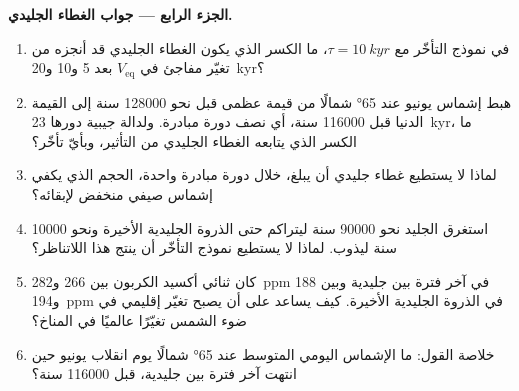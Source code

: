 \begin{problem}
\medskip\noindent\textbf{الجزء الرابع --- جواب الغطاء الجليدي.}
\begin{enumerate}[resume]
  \item في نموذج التأخّر مع $\tau = \qty{10}{kyr}$، ما الكسر الذي يكون الغطاء الجليدي قد أنجزه من تغيّر مفاجئ في
        $V_{\mathrm{eq}}$ بعد 5 و10 و\qty{20}{kyr}؟
  \item هبط إشماس يونيو عند \ang{65} شمالًا من قيمة عظمى قبل نحو \num{128000} سنة إلى
        القيمة الدنيا قبل \num{116000} سنة، أي نصف دورة مبادرة. ولدالة جيبية دورها
        \qty{23}{kyr}، ما الكسر الذي يتابعه الغطاء الجليدي من التأثير، وبأيّ تأخّر؟
  \item لماذا لا يستطيع غطاء جليدي أن يبلغ، خلال دورة مبادرة واحدة، الحجم الذي يكفي إشماس صيفي
        منخفض لإبقائه؟
  \item استغرق الجليد نحو \num{90000} سنة ليتراكم حتى الذروة الجليدية الأخيرة ونحو
        \num{10000} سنة ليذوب. لماذا لا يستطيع نموذج التأخّر أن ينتج هذا اللاتناظر؟
  \item كان ثنائي أكسيد الكربون بين 266 و\qty{282}{ppm} في آخر فترة بين جليدية وبين
        188 و\qty{194}{ppm} في الذروة الجليدية الأخيرة. كيف يساعد على أن يصبح تغيّر إقليمي في
        ضوء الشمس تغيّرًا عالميًا في المناخ؟
  \item خلاصة القول: ما الإشماس اليومي المتوسط عند \ang{65} شمالًا يوم انقلاب يونيو حين
        انتهت آخر فترة بين جليدية، قبل \num{116000} سنة؟
\end{enumerate}
\end{problem}
